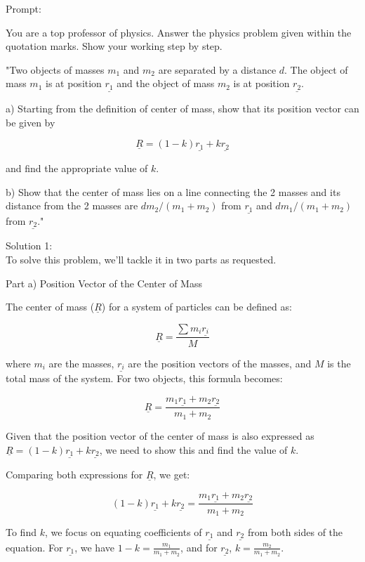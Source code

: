 \documentclass[a4paper,11pt]{article}
\begin{document}
Prompt:
\begin{spverbatim}
    You are a top professor of physics. Answer the physics problem given within the quotation marks. Show your working step by step.

    "Two objects of masses \( m_{1} \) and \( m_{2} \) are separated by a distance \( d \). The object of mass \( m_{1} \) is at position \( \underline{r_{1}} \) and the object of mass \( m_{2} \) is at position \( \underline{r_{2}} \).

    a) Starting from the definition of center of mass, show that its position vector can be given by 

    \[ \underline{R} = (1-k)\underline{r_{1}} + k\underline{r_{2}} \]

    and find the appropriate value of \( k \). 

    b) Show that the center of mass lies on a line connecting the 2 masses and its distance from the 2 masses are \( d m_{2}/(m_{1}+m_{2}) \) from \( \underline{r_{1}} \) and \( d m_{1}/(m_{1}+m_{2}) \) from \( \underline{r_{2}} \)."
\end{spverbatim}

\bigskip

\noindent Solution 1: \\

To solve this problem, we'll tackle it in two parts as requested.

Part a) Position Vector of the Center of Mass

The center of mass (\( \underline{R} \)) for a system of particles can be defined as:

\[ \underline{R} = \frac{\sum m_i \underline{r_i}}{M} \]

where \( m_i \) are the masses, \( \underline{r_i} \) are the position vectors of the masses, and \( M \) is the total mass of the system. For two objects, this formula becomes:

\[ \underline{R} = \frac{m_1 \underline{r_1} + m_2 \underline{r_2}}{m_1 + m_2} \]

Given that the position vector of the center of mass is also expressed as \( \underline{R} = (1-k)\underline{r_{1}} + k\underline{r_{2}} \), we need to show this and find the value of \( k \).

Comparing both expressions for \( \underline{R} \), we get:

\[ (1-k)\underline{r_{1}} + k\underline{r_{2}} = \frac{m_1 \underline{r_1} + m_2 \underline{r_2}}{m_1 + m_2} \]

To find \( k \), we focus on equating coefficients of \( \underline{r_{1}} \) and \( \underline{r_{2}} \) from both sides of the equation. For \( \underline{r_{1}} \), we have \( 1-k = \frac{m_1}{m_1 + m_2} \), and for \( \underline{r_{2}} \), \( k = \frac{m_2}{m_1 + m_2} \).
\end{document}
